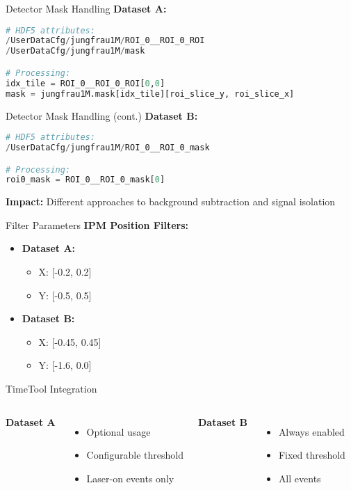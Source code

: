 \documentclass{beamer}
\begin{document}
\begin{frame}[fragile]{Detector Mask Handling}
\textbf{Dataset A:}
\begin{lstlisting}[language=Python]
# HDF5 attributes:
/UserDataCfg/jungfrau1M/ROI_0__ROI_0_ROI
/UserDataCfg/jungfrau1M/mask  

# Processing:
idx_tile = ROI_0__ROI_0_ROI[0,0]
mask = jungfrau1M.mask[idx_tile][roi_slice_y, roi_slice_x]
\end{lstlisting}
\end{frame}

\begin{frame}[fragile]{Detector Mask Handling (cont.)}
\textbf{Dataset B:}
\begin{lstlisting}[language=Python]
# HDF5 attributes:
/UserDataCfg/jungfrau1M/ROI_0__ROI_0_mask

# Processing:
roi0_mask = ROI_0__ROI_0_mask[0]
\end{lstlisting}

\textbf{Impact:} Different approaches to background subtraction and signal isolation
\end{frame}

\begin{frame}{Filter Parameters}
\textbf{IPM Position Filters:}
\begin{itemize}
\item \textbf{Dataset A:}
    \begin{itemize}
    \item X: [-0.2, 0.2]
    \item Y: [-0.5, 0.5]
    \end{itemize}
\item \textbf{Dataset B:}
    \begin{itemize}
    \item X: [-0.45, 0.45]
    \item Y: [-1.6, 0.0]
    \end{itemize}
\end{itemize}
\end{frame}

\begin{frame}{TimeTool Integration}
\begin{columns}
\textbf{Dataset A}
\begin{itemize}
\item Optional usage
\item Configurable threshold
\item Laser-on events only
\end{itemize}

\textbf{Dataset B}
\begin{itemize}
\item Always enabled
\item Fixed threshold
\item All events
\end{itemize}
\end{columns}
\end{frame}
\end{document}
